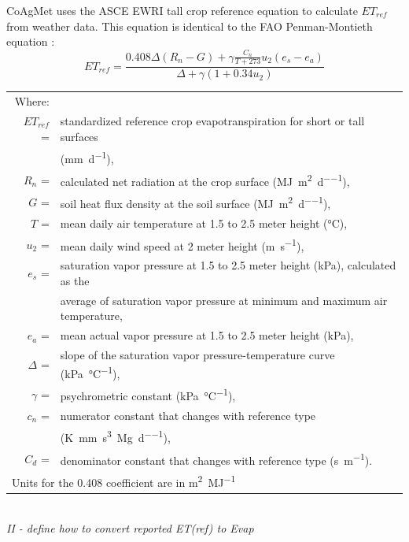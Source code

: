 \begin{linenumbers}
CoAgMet uses the ASCE EWRI tall crop reference equation to calculate $ET_{ref}$ from weather data.  This equation is identical to the FAO Penman-Montieth equation \citep{walter2000asce,FAO56}:
\begin{equation}
\label{eq:ET}
	ET_{ref}=\frac{0.408\Delta(R_n-G)+\gamma\frac{C_n}{T+273}u_2(e_s-e_a)}{\Delta+\gamma(1+0.34u_2)}
\end{equation}
\begin{tabular}{rl}
Where: &\\
$ET_{ref}$ =&standardized reference crop evapotranspiration for short or tall surfaces \\
&(\si{\milli\meter\per\day}),\\
$R_n$ =&calculated net radiation at the crop surface (\si{\mega\joule\per\meter\squared\per\day}),\\
$G$ =&soil heat flux density at the soil surface (\si{\mega\joule\per\meter\squared\per\day}),\\
$T$ =&mean daily air temperature at 1.5 to 2.5 meter height (\si{\degreeCelsius}),\\
$u_2$ =&mean daily wind speed at 2 meter height (\si{\meter\per\second}),\\
$e_s$ =&saturation vapor pressure at 1.5 to 2.5 meter height (\si{\kilo\pascal}), calculated as the \\
&average of saturation vapor pressure at minimum and maximum air temperature,\\
$e_a$ =&mean actual vapor pressure at 1.5 to 2.5 meter height (\si{\kilo\pascal}),\\
$\Delta$ =&slope of the saturation vapor pressure-temperature curve (\si{\kilo\pascal\per\degreeCelsius}),\\
$\gamma$ =&psychrometric constant (\si{\kilo\pascal\per\degreeCelsius}),\\
$c_n$ =&numerator constant that changes with reference type \\
&(\si{\kelvin\milli\meter\second\cubed\per\mega\gram\per\day}),\\
$C_d$ =&denominator constant that changes with reference type (\si{\second\per\meter}).\\
\multicolumn{2}{l}{Units for the 0.408 coefficient are in \si{\meter\squared\per\mega\joule}}\\
\end{tabular}\\

\emph{II - define how to convert reported ET(ref) to Evap}\\


\end{linenumbers}
